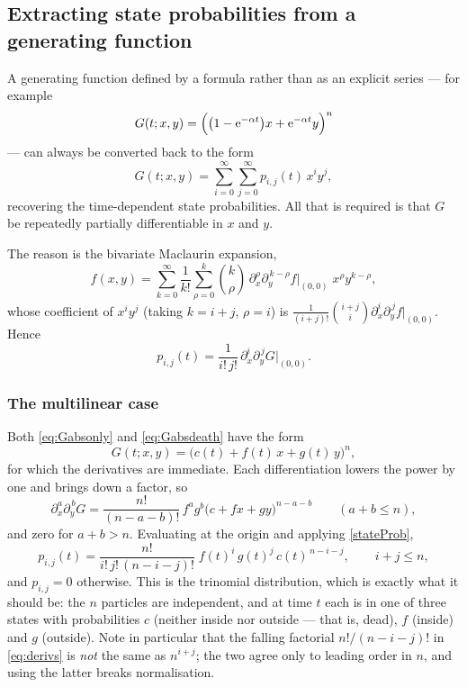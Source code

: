 \subsection{Extracting state probabilities from a generating function}
\label{app:extract}

A generating function defined by a formula rather than as an explicit series --- for
example
\begin{equation}
\label{examplePgf}
G(t;x,y) = \Bigl(\bigl(1-{\rm e}^{-\alpha t}\bigr)x + {\rm e}^{-\alpha t}y\Bigr)^n
\end{equation}
--- can always be converted back to the form
\begin{equation}
\label{series1}
G(t;x,y) = \sum^{\infty}_{i=0}\sum^{\infty}_{j=0} p_{i,j}(t)\,x^iy^j ,
\end{equation}
recovering the time-dependent state probabilities. All that is required is that
$G$ be repeatedly partially differentiable in $x$ and $y$.

The reason is the bivariate Maclaurin expansion,
\begin{equation*}
f(x,y) = \sum^{\infty}_{k=0}\frac{1}{k!}\sum^{k}_{\rho=0}\binom{k}{\rho}\,\partial_x^{\rho}\partial_y^{\,k-\rho}f\Big|_{(0,0)}\;x^{\rho}y^{k-\rho} ,
\end{equation*}
whose coefficient of $x^iy^j$ (taking $k=i+j$, $\rho=i$) is
$\frac{1}{(i+j)!}\binom{i+j}{i}\partial_x^i\partial_y^{\,j}f\big|_{(0,0)}$. Hence
\begin{equation}
\label{stateProb}
p_{i,j}(t) = \frac{1}{i!\,j!}\,\partial_x^i\partial_y^{\,j}G\Big|_{(0,0)} .
\end{equation}

\subsubsection*{The multilinear case}

Both \cref{eq:Gabsonly} and \cref{eq:Gabsdeath} have the form
\begin{equation}
\label{eq:multilinear}
G(t;x,y) = \bigl(c(t) + f(t)\,x + g(t)\,y\bigr)^n ,
\end{equation}
for which the derivatives are immediate. Each differentiation lowers the power by
one and brings down a factor, so
\begin{equation}
\label{eq:derivs}
\partial_x^{a}\partial_y^{\,b}G = \frac{n!}{(n-a-b)!}\,f^{a}g^{b}\bigl(c+fx+gy\bigr)^{n-a-b}
\qquad (a+b\le n),
\end{equation}
and zero for $a+b>n$. Evaluating at the origin and applying \cref{stateProb},
\begin{equation}
\label{stateProbSpec}
p_{i,j}(t) = \frac{n!}{i!\,j!\,(n-i-j)!}\;f(t)^{i}\,g(t)^{j}\,c(t)^{\,n-i-j},
\qquad i+j\le n,
\end{equation}
and $p_{i,j}=0$ otherwise. This is the trinomial distribution, which is exactly what
it should be: the $n$ particles are independent, and at time $t$ each is in one of
three states with probabilities $c$ (neither inside nor outside --- that is, dead),
$f$ (inside) and $g$ (outside). Note in particular that the falling factorial
$n!/(n-i-j)!$ in \cref{eq:derivs} is \emph{not} the same as $n^{i+j}$; the two agree
only to leading order in $n$, and using the latter breaks normalisation.

